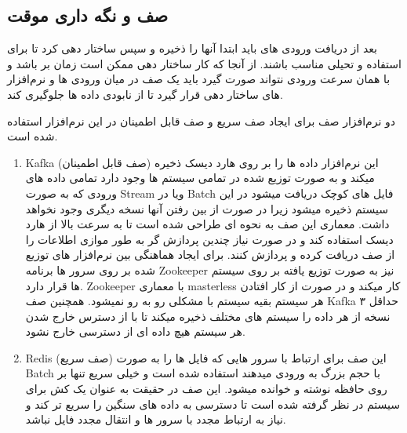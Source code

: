 \documentclass{llncs}
\begin{document}
\subsection{صف و نگه داری موقت}

بعد از دریافت ورودی های باید ابتدا آنها را ذخیره و سپس ساختار دهی کرد تا برای استفاده و تحیلی مناسب باشند.
از آنجا که کار ساختار دهی ممکن است زمان بر باشد و با همان سرعت ورودی نتواند صورت گیرد باید یک صف در میان ورودی ها و نرم‌افزار های ساختار دهی قرار گیرد تا از نابودی داده ها جلوگیری کند.

دو نرم‌افزار صف برای ایجاد صف سریع و صف قابل اطمینان در این نرم‌افزار استفاده شده است.

\begin{enumerate}
    \item Kafka (صف قابل اطمینان)
    \newline
    این نرم‌افزار داده ها را بر روی هارد دیسک ذخیره میکند و به صورت توزیع شده در تمامی سیستم ها وجود دارد تمامی داده های ورودی که به صورت Stream ویا در Batch فایل های کوچک دریافت میشود در این سیستم ذخیره میشود زیرا در صورت از بین رفتن آنها نسخه دیگری وجود نخواهد داشت.
    معماری این صف به نحوه ای طراحی شده است تا به سرعت بالا از هارد دیسک استفاده کند و در صورت نیاز چندین پردازش گر به طور موازی اطلاعات را از صف دریافت کرده و پردازش کنند.
    برای ایجاد هماهنگی بین نرم‌افزار های توزیع شده بر روی سرور ها برنامه Zookeeper نیز به صورت توزیع یافته بر روی سیستم ها قرار دارد.
    Zookeeper با معماری masterless کار میکند و در صورت از کار افتادن هر سیستم بقیه سیستم با مشکلی رو به رو نمیشود.
    همچنین صف Kafka حداقل ۳ نسخه از هر داده را سیستم های مختلف ذخیره میکند تا با از دسترس خارج شدن هر سیستم هیچ داده ای از دسترسی خارج نشود.
    \item Redis (صف سریع)
    \newline
    این صف برای ارتباط با سرور هایی که فایل ها را به صورت Batch با حجم بزرگ به ورودی میدهند استفاده شده است و خیلی سریع تنها بر روی حافظه نوشته و خوانده میشود.
    این صف در حقیقت به عنوان یک کش برای سیستم در نظر گرفته شده است تا دسترسی به داده های سنگین را سریع تر کند و نیاز به ارتباط مجدد با سرور ها و انتقال مجدد فایل نباشد.
\end{enumerate}
\end{document}
